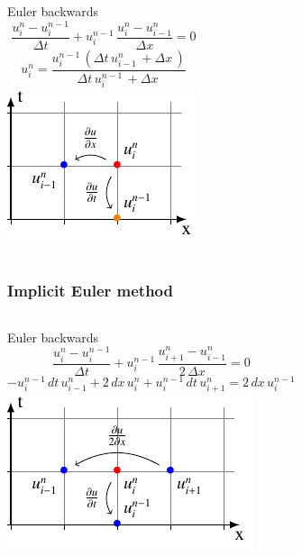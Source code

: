\begin{frame}
  \begin{columns}
      Euler backwards
  $$\frac{u_{i}^{n}-u_{i}^{n-1}}{\Delta t}+ u_{i}^{n-1}\, \frac{u_{i}^{n}-u_{i-1}^{n}}{\Delta x}=0$$
  $$ u_{i}^{n} = \frac{u^{n-1}_{i}\, \left(\Delta{t}\, u^{n}_{i-1}\, + \Delta{x}\,\right)}{\Delta{t}\, u^{n-1}_{i}\, + \Delta{x}\,} $$
    \includegraphics[width=\linewidth]{../BurgersEquation/tikz/linear5/linear5.pdf}\\
  \end{columns}
\end{frame}

\begin{frame}
  \frametitle{Implicit Euler method}
  \begin{columns}
    Euler backwards
    $$\frac{u_{i}^{n}-u_{i}^{n-1}}{\Delta t}+ u_{i}^{n-1}\, \frac{u_{i+1}^{n}-u_{i-1}^{n}}{2\,\Delta x}=0$$
$$-u_{i}^{n-1} \, dt \, u_{i-1}^{n} +  2 \, dx \,  u_{i}^{n} + u_{i}^{n-1} \, dt \, u_{i+1}^{n}=  2 \, dx \, u_{i}^{n-1}$$
    \includegraphics[width=\linewidth]{../BurgersEquation/tikz/implicit/implicit.pdf}\\
  \end{columns}
\end{frame}

